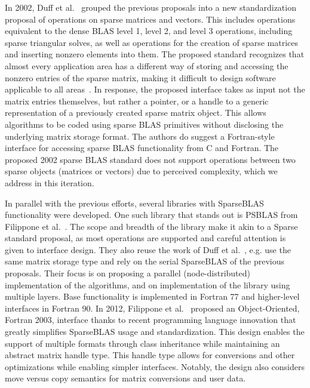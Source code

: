 \documentclass[manuscript,review]{acmart}
\begin{document}
In 2002, Duff et al.~\cite{10.1145/567806.567810} grouped the previous
proposals into a new standardization proposal of operations on sparse matrices
and vectors. This includes operations equivalent to the dense BLAS level 1, level 2, and level 3 operations, including sparse triangular solves, as well as operations for the creation of sparse matrices and inserting nonzero
elements into them. The proposed standard recognizes that almost
every application area has a different way of storing and accessing the nonzero
entries of the sparse matrix, making it difficult to design software applicable to
all areas~\cite{10.1145/567806.567810}. In response, the proposed interface takes
as input not the matrix entries themselves, but rather a pointer, or a handle to
a generic representation of a previously created sparse matrix object. This
allows algorithms to be coded using sparse BLAS primitives without disclosing
the underlying matrix storage format. The authors do suggest a Fortran-style
interface for accessing sparse BLAS functionality from C and Fortran.  The
proposed 2002 sparse BLAS standard does not support operations between two sparse
objects (matrices or vectors) due to perceived complexity, which we 
address in this iteration.

In parallel with the previous efforts, several libraries with SparseBLAS
functionality were developed. One such library that stands out is PSBLAS from
Filippone et al.~\cite{10.1145/365723.365732}. The scope and breadth of the
library make it akin to a Sparse standard proposal, as most operations are
supported and careful attention is given to interface design. They also
reuse the work of Duff et al.~\cite{10.1145/275323.275327}, e.g. use the same
matrix storage type and rely on the serial SparseBLAS of the previous
proposals. Their focus is on proposing a parallel (node-distributed)
implementation of the algorithms,
and on implementation of the library using
multiple layers. Base functionality is implemented in Fortran 77 and
higher-level interfaces in Fortran 90. In 2012, Filippone et
al.~\cite{10.1145/2331130.2331131} proposed an Object-Oriented, Fortran 2003,
interface thanks to recent programming language innovation that greatly
simplifies SparseBLAS usage and standardization. This design enables the support
of multiple formats through class inheritance while maintaining an abstract
matrix handle type. This handle type allows for conversions and other optimizations while
enabling simpler interfaces. Notably, the design also considers move versus copy
semantics for matrix conversions and user data.
\end{document}
